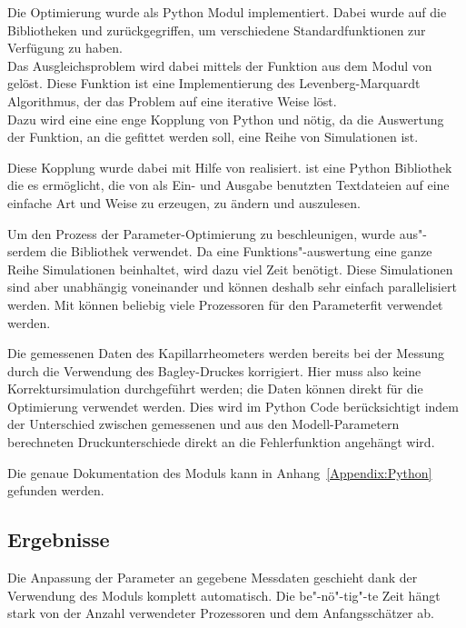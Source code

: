 Die Optimierung wurde als Python Modul  implementiert. Dabei wurde auf die Bibliotheken  und  \cite{scipy} zurückgegriffen, um verschiedene Standardfunktionen zur Verfügung zu haben.\\
Das Ausgleichsproblem wird dabei mittels der Funktion  aus dem Modul  von  gelöst.
Diese Funktion ist eine Implementierung des Levenberg-Marquardt Algorithmus, der das Problem auf eine iterative Weise löst.\\
Dazu wird eine eine enge Kopplung von Python und \openfoam{} nötig, da die Auswertung der Funktion, an die gefittet werden soll, eine Reihe von Simulationen ist.

Diese Kopplung wurde dabei mit Hilfe von  \cite{pyfoam} realisiert.  ist eine Python Bibliothek die es ermöglicht, die von \openfoam{} als Ein- und Ausgabe benutzten Textdateien auf eine einfache Art und Weise zu erzeugen, zu ändern und auszulesen.

Um den Prozess der Parameter-Optimierung zu beschleunigen, wurde aus"-serdem die Bibliothek  \cite{parallelpython} verwendet. Da eine Funktions"-auswertung eine ganze Reihe Simulationen beinhaltet, wird dazu viel Zeit benötigt. Diese Simulationen sind aber unabhängig voneinander und können deshalb sehr einfach parallelisiert werden. Mit  können beliebig viele Prozessoren für den Parameterfit verwendet werden.

Die gemessenen Daten des Kapillarrheometers werden bereits bei der Messung durch die Verwendung des Bagley-Druckes korrigiert. Hier muss also keine Korrektursimulation durchgeführt werden; die Daten können direkt für die Optimierung verwendet werden. Dies wird im Python Code berücksichtigt indem der Unterschied zwischen gemessenen und aus den Modell-Parametern berechneten Druckunterschiede direkt an die Fehlerfunktion angehängt wird.

Die genaue Dokumentation des  Moduls kann in Anhang~\ref{Appendix:Python} gefunden werden.
%
\subsection{Ergebnisse}
Die Anpassung der Parameter an gegebene Messdaten geschieht dank der Verwendung des  Moduls komplett automatisch. 
Die be"-nö"-tig"-te Zeit hängt stark von der Anzahl verwendeter Prozessoren und dem Anfangsschätzer ab.
%
